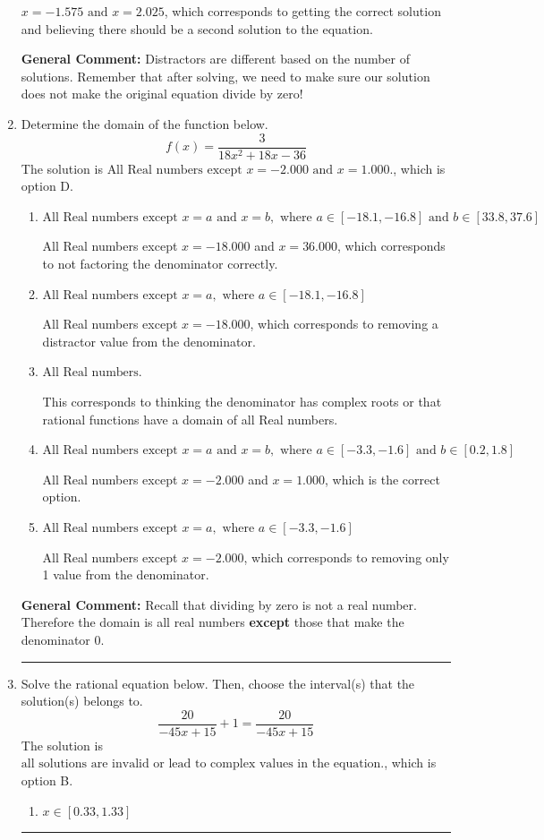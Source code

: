 \documentclass{extbook}[14pt]
\newcommand{\litem}[1]{\item #1

\rule{\textwidth}{0.4pt}}
\begin{document}
\begin{enumerate}
{\begin{enumerate}[label=\Alph*.]
$x = -1.575 \text{ and } x = 2.025$, which corresponds to getting the correct solution and believing there should be a second solution to the equation.
\end{enumerate}

\textbf{General Comment:} Distractors are different based on the number of solutions. Remember that after solving, we need to make sure our solution does not make the original equation divide by zero!
}
\litem{
Determine the domain of the function below.
\[ f(x) = \frac{3}{18x^{2} +18 x -36} \]
The solution is \( \text{All Real numbers except } x = -2.000 \text{ and } x = 1.000. \), which is option D.\begin{enumerate}[label=\Alph*.]
\item \( \text{All Real numbers except } x = a \text{ and } x = b, \text{ where } a \in [-18.1, -16.8] \text{ and } b \in [33.8, 37.6] \)

All Real numbers except $x = -18.000$ and $x = 36.000$, which corresponds to not factoring the denominator correctly.
\item \( \text{All Real numbers except } x = a, \text{ where } a \in [-18.1, -16.8] \)

All Real numbers except $x = -18.000$, which corresponds to removing a distractor value from the denominator.
\item \( \text{All Real numbers.} \)

This corresponds to thinking the denominator has complex roots or that rational functions have a domain of all Real numbers.
\item \( \text{All Real numbers except } x = a \text{ and } x = b, \text{ where } a \in [-3.3, -1.6] \text{ and } b \in [0.2, 1.8] \)

All Real numbers except $x = -2.000$ and $x = 1.000$, which is the correct option.
\item \( \text{All Real numbers except } x = a, \text{ where } a \in [-3.3, -1.6] \)

All Real numbers except $x = -2.000$, which corresponds to removing only 1 value from the denominator.
\end{enumerate}

\textbf{General Comment:} Recall that dividing by zero is not a real number. Therefore the domain is all real numbers \textbf{except} those that make the denominator 0.
}
\litem{
Solve the rational equation below. Then, choose the interval(s) that the solution(s) belongs to.
\[ \frac{20}{-45x + 15} + 1 = \frac{20}{-45x + 15} \]
The solution is \( \text{all solutions are invalid or lead to complex values in the equation.} \), which is option B.\begin{enumerate}[label=\Alph*.]
\item \( x \in [0.33,1.33] \)


\end{enumerate}}
\end{enumerate}
\end{document}
